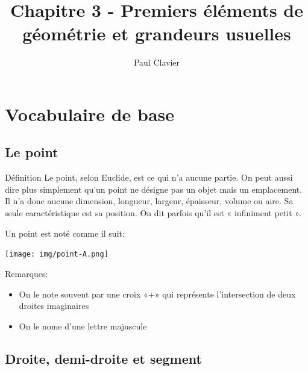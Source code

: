 \documentclass[12pt,a4paper]{article}
\author{Paul Clavier}
\title{Chapitre 3 - Premiers éléments de géométrie et grandeurs usuelles}
\begin{document}
\renewcommand\thesection{\Roman{section}}
\renewcommand\thesubsection{\arabic{subsection}}


\ifdefined\isprof
	\TeacherModeOn
\fi




\begin{center}
\end{center}

\section{Vocabulaire de base}

\subsection{Le point}

\begin{definition}{Définition}
Le point, selon Euclide, est ce qui n'a aucune partie. On peut aussi dire plus simplement qu'un point ne désigne pas un objet mais un emplacement. Il n'a donc aucune dimension, longueur, largeur, épaisseur, volume ou aire. Sa seule caractéristique est sa position. On dit parfois qu'il est « infiniment petit ».
\end{definition}
Un point est noté comme il suit:\\
\begin{minipage}{0.2\textwidth}
\begin{center}
\texttt{[image: img/point-A.png]}
\end{center}
\end{minipage}
\begin{minipage}{0.8\textwidth}
Remarques:
\begin{itemize}
\item On le note souvent par une croix «+» qui représente l'intersection de deux droites imaginaires
\item On le nome d'une lettre majuscule
\end{itemize}
\end{minipage}

\subsection{Droite, demi-droite et segment}
\end{document}
